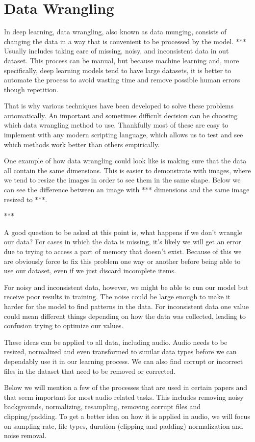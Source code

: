 \documentclass{book}
\begin{document}
\section{Data Wrangling}
\qquad In deep learning, data wrangling, also known as data munging, consists of changing the data in a way that is convenient to be processed by the model. *** %
Usually includes taking care of missing, noisy, and inconsistent data in out dataset.
This process can be manual, but because machine learning and, more specifically, deep learning models tend to have large datasets, it is better to automate the process to avoid wasting time and remove possible human errors though repetition.
\par
That is why various techniques have been developed to solve these problems automatically.
An important and sometimes difficult decision can be choosing which data wrangling method to use.
Thankfully most of these are easy to implement with any modern scripting language, which allows us to test and see which methods work better than others empirically.
\par
One example of how data wrangling could look like is making sure that the data all contain the same dimensions.
This is easier to demonstrate with images, where we tend to resize the images in order to see them in the same shape.
Below we can see the difference between an image with *** dimensions and the same image resized to ***.
\par
*** %
\par
A good question to be asked at this point is, what happens if we don't wrangle our data?
For cases in which the data is missing, it's likely we will get an error due to trying to access a part of memory that doesn't exist.
Because of this we are obviously force to fix this problem one way or another before being able to use our dataset, even if we just discard incomplete items.
\par
For noisy and inconsistent data, however, we might be able to run our model but receive poor results in training.
The noise could be large enough to make it harder for the model to find patterns in the data.
For inconsistent data one value could mean different things depending on how the data was collected, leading to confusion trying to optimize our values.
\par
These ideas can be applied to all data, including audio.
Audio needs to be resized, normalized and even transformed to similar data types before we can dependably use it in our learning process.
We can also find corrupt or incorrect files in the dataset that need to be removed or corrected.
\par
Below we will mention a few of the processes that are used in certain papers and that seem important for most audio related tasks.
This includes removing noisy backgrounds, normalizing, resampling, removing corrupt files and clipping/padding.
To get a better idea on how it is applied in audio, we will focus on sampling rate, file types, duration (clipping and padding) normalization and noise removal.
\end{document}
